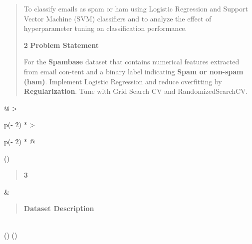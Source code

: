\documentclass[
]{article}
\begin{document}
\begin{quote}
To classify emails as spam or ham using Logistic Regression and Support
Vector Machine (SVM) classifiers and to analyze the effect of
hyperparameter tuning on classification performance.

\textbf{2} \textbf{Problem Statement}

For the \textbf{Spambase} dataset that contains numerical features
extracted from email con-tent and a binary label indicating \textbf{Spam
or non-spam (ham)}. Implement Logistic Regression and reduce overfitting
by \textbf{Regularization}. Tune with Grid Search CV and
RandomizedSearchCV.
\end{quote}

\begin{longtable}[]{@{}
  >{\raggedright\arraybackslash}p{(\columnwidth - 2\tabcolsep) * }
  >{\raggedright\arraybackslash}p{(\columnwidth - 2\tabcolsep) * }@{}}
\toprule()
\begin{minipage}[b]{\linewidth}\raggedright
\begin{quote}
\textbf{3}
\end{quote}
\end{minipage} & \begin{minipage}[b]{\linewidth}\raggedright
\begin{quote}
\textbf{Dataset Description}
\end{quote}
\end{minipage} \\
\midrule()
\endhead
\bottomrule()
\end{longtable}
\end{document}
